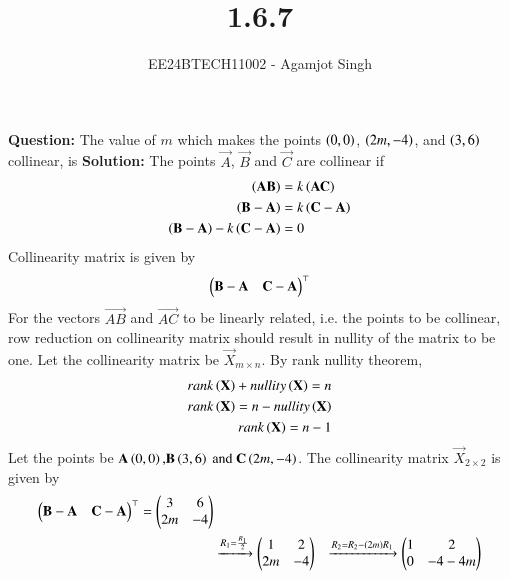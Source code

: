 \documentclass[journal]{IEEEtran}
\begin{document}

\vspace{3cm}

\title{1.6.7}
\author{EE24BTECH11002 - Agamjot Singh
}
{\let\newpage\relax\maketitle}

\renewcommand{\thefigure}{\theenumi}
\renewcommand{\thetable}{\theenumi}
\setlength{\intextsep}{10pt} %

\textbf{Question:}
\newline
The value of $m$ which makes the points $\left(0, 0\right)$, $\left(2m, -4\right)$, and $\left(3,6\right)$ collinear, is
\newline
\textbf{Solution:}
\newline
The points $\vec{A}$, $\vec{B}$ and $\vec{C}$ are collinear if
\begin{align}
	\left(\mathbf{AB}\right) &= k\left(\mathbf{AC}\right)\\
	\left(\mathbf{B} - \mathbf{A}\right) &= k\left(\mathbf{C} - \mathbf{A}\right)\\
	\left(\mathbf{B} - \mathbf{A}\right) - k\left(\mathbf{C} - \mathbf{A}\right) &= 0
\end{align}
Collinearity matrix is given by
\begin{align}
	\begin{pmatrix}\mathbf{B} - \mathbf{A} & \mathbf{C} - \mathbf{A}\end{pmatrix}^\top 
\end{align}
For the vectors $\vec{AB}$ and $\vec{AC}$ to be linearly related, i.e. the points to be collinear, row reduction on collinearity matrix should result in nullity of the matrix to be one.
\newline
Let the collinearity matrix be $\vec{X}_{m\times n}$.
By rank nullity theorem,
\begin{align}
	rank\left(\mathbf{X}\right) + nullity\left(\mathbf{X}\right) = n\\
	rank\left(\mathbf{X}\right) = n - nullity\left(\mathbf{X}\right)\\
	rank\left(\mathbf{X}\right) = n - 1
\end{align}
\newline
Let the points be $\mathbf{A}\left(0, 0\right) \text{,} \mathbf{B}\left(3, 6\right) \text{ and } \mathbf{C}\left(2m, -4\right)$.
The collinearity matrix $\vec{X}_{2\times 2}$ is given by
\begin{align}
	\begin{pmatrix}\mathbf{B} - \mathbf{A} & \mathbf{C} - \mathbf{A}\end{pmatrix}^\top = \begin{pmatrix}3 & 6 \\ 2m & -4\end{pmatrix}\\ 
													   &\xrightarrow{R_1 = \frac{R_1}{2}} \begin{pmatrix}1 & 2\\2m & -4\end{pmatrix}
													   &\xrightarrow{R_2 = R_2 - \left(2m\right)R_1} \begin{pmatrix}1 & 2\\0 & -4-4m\end{pmatrix}
\end{align}
\end{document}
